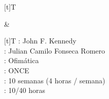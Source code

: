 \documentclass[letterpaper,10pt,spanish]{sphinxmanual}
\begin{document}
\begin{savenotes}\sphinxattablestart
\sphinxthistablewithglobalstyle
\centering
\begin{tabular}[t]{}
\sphinxtoprule
\sphinxtableatstartofbodyhook

\begin{savenotes}\sphinxattablestart
\sphinxthistablewithglobalstyle
\centering
\begin{tabulary}{\linewidth}[t]{T}
\sphinxtoprule
\sphinxtableatstartofbodyhook
\sphinxAtStartPar
{}
\\
\sphinxbottomrule
\end{tabulary}
\sphinxtableafterendhook\par
\sphinxattableend\end{savenotes}
&

\begin{savenotes}\sphinxattablestart
\sphinxthistablewithglobalstyle
\centering
\begin{tabulary}{\linewidth}[t]{T}
\sphinxtoprule
\sphinxtableatstartofbodyhook
\sphinxAtStartPar
{}: John F. Kennedy
\\
\sphinxhline
\sphinxAtStartPar
{}: Julian Camilo Fonseca Romero
\\
\sphinxhline
\sphinxAtStartPar
{}: Ofimática
\\
\sphinxhline
\sphinxAtStartPar
{}: ONCE
\\
\sphinxhline
\sphinxAtStartPar
{}: 10 semanas (4 horas / semana)
\\
\sphinxhline
\sphinxAtStartPar
{}: 10/40 horas
\\
\sphinxbottomrule
\end{tabulary}
\sphinxtableafterendhook\par
\sphinxattableend\end{savenotes}
\\
\sphinxbottomrule
\end{tabular}
\sphinxtableafterendhook\par
\sphinxattableend\end{savenotes}
\end{document}
